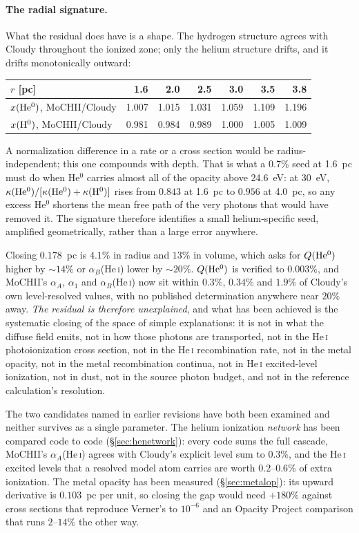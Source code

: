 \documentclass[english,a4paper]{my_memo}
\begin{document}
\paragraph{The radial signature.}  What the residual does have is a shape.
The hydrogen structure agrees with Cloudy throughout the ionized zone; only
the helium structure drifts, and it drifts monotonically outward:
\begin{center}
\begin{tabular}{lrrrrrr}
\toprule
$r$ [pc] & 1.6 & 2.0 & 2.5 & 3.0 & 3.5 & 3.8 \\
\midrule
$x({\rm He^0})$, MoCHII/Cloudy & 1.007 & 1.015 & 1.031 & 1.059 & 1.109
  & 1.196 \\
$x({\rm H^0})$, MoCHII/Cloudy  & 0.981 & 0.984 & 0.989 & 1.000 & 1.005
  & 1.009 \\
\bottomrule
\end{tabular}
\end{center}
A normalization difference in a rate or a cross section would be
radius-independent; this one compounds with depth.  That is what a $0.7\%$
seed at 1.6~pc must do when He$^0$ carries almost all of the opacity above
24.6~eV: at 30~eV,
$\kappa({\rm He^0})/[\kappa({\rm He^0})+\kappa({\rm H^0})]$ rises from
$0.843$ at 1.6~pc to $0.956$ at 4.0~pc, so any excess He$^0$ shortens the
mean free path of the very photons that would have removed it.  The
signature therefore identifies a small helium-specific seed, amplified
geometrically, rather than a large error anywhere.

Closing $0.178$~pc is $4.1\%$ in radius and $13\%$ in volume, which asks for
$Q({\rm He^0})$ higher by ${\sim}14\%$ or $\alpha_B$(He\,\textsc{i}) lower by
${\sim}20\%$.  $Q({\rm He^0})$ is verified to $0.003\%$, and MoCHII's
$\alpha_A$, $\alpha_1$ and $\alpha_B$(He\,\textsc{i}) now sit within $0.3\%$,
$0.34\%$ and $1.9\%$ of Cloudy's own level-resolved values, with no
published determination anywhere near $20\%$ away.  \emph{The residual is
therefore unexplained}, and what has been achieved is the systematic closing
of the space of simple explanations: it is not in what the diffuse field
emits, not in how those photons are transported, not in the He\,\textsc{i}
photoionization cross section, not in the He\,\textsc{i} recombination rate,
not in the metal opacity, not in the metal recombination continua, not in
He\,\textsc{i} excited-level ionization, not in dust, not in the source
photon budget, and not in the reference calculation's resolution.

The two candidates named in earlier revisions have both been examined and
neither survives as a single parameter.  The helium ionization
\emph{network} has been compared code to code (\S\ref{sec:henetwork}): every
code sums the full cascade, MoCHII's $\alpha_A$(He\,\textsc{i}) agrees with
Cloudy's explicit level sum to $0.3\%$, and the He\,\textsc{i} excited levels
that a resolved model atom carries are worth $0.2$--$0.6\%$ of extra
ionization.  The metal opacity has been measured
(\S\ref{sec:metalop}): its upward derivative is $0.103$~pc per unit, so
closing the gap would need $+180\%$ against cross sections that reproduce
Verner's to $10^{-6}$ and an Opacity Project comparison that runs $2$--$14\%$
the other way.
\end{document}
